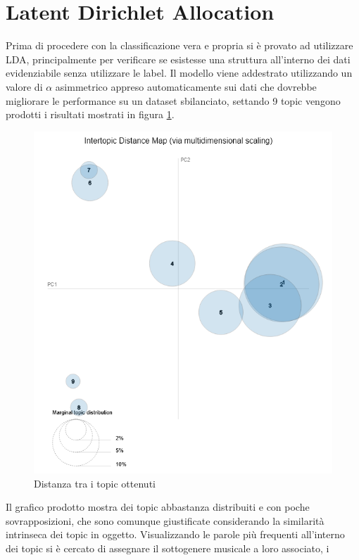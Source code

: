 \documentclass[technote]{IEEEtran}
\begin{document}
\section{Latent Dirichlet Allocation}
Prima di procedere con la classificazione vera e propria
si è provato ad utilizzare LDA, principalmente per verificare
se esistesse una struttura all'interno dei dati evidenziabile senza utilizzare
le label.
Il modello viene addestrato utilizzando un valore di $ \alpha $ asimmetrico
appreso automaticamente sui dati che dovrebbe migliorare le performance su
un dataset sbilanciato, settando 9 topic vengono prodotti i
risultati mostrati in figura \ref{fig_topic_pca}.
\begin{figure}[H]
\centerline{\includegraphics[width=1\columnwidth, scale=0.3]{images/topic_pca}}
\caption{Distanza tra i topic ottenuti}
\label{fig_topic_pca}
\end{figure}
Il grafico prodotto mostra dei topic abbastanza distribuiti e con poche
sovrapposizioni, che sono comunque giustificate considerando
la similarità intrinseca dei topic in oggetto.
Visualizzando le parole più frequenti all'interno dei topic si è cercato di
assegnare il sottogenere musicale a loro associato, i
\end{document}
